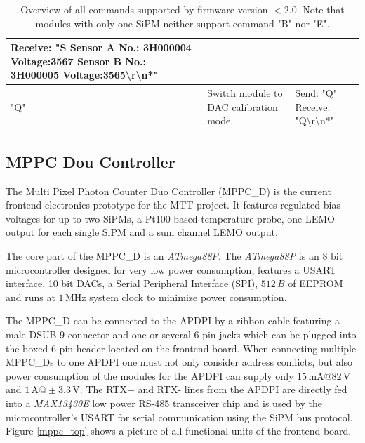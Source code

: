 \begin{table}
\begin{center}
\begin{tabular}[]{|l||p{6cm}|p{4cm}|}
			\newline Receive: "S Sensor A No.: 3H000004 Voltage:3567 Sensor B No.: 3H000005 Voltage:3565\textbackslash r\textbackslash n*" \\
			\hline
			"Q" & Switch module to DAC calibration mode. & Send: "Q" \newline Receive: "Q\textbackslash r\textbackslash n*" \\
			\hline
			\end{tabular}
		\end{center}
		\caption{Overview of all commands supported by firmware version $<2.0$. Note that modules with only one SiPM neither support command "B" nor "E".}
		\label{sipm_bus_table}
	\end{table}

\subsection{MPPC Dou Controller}

The Multi Pixel Photon Counter Duo Controller (MPPC\_D) is the current frontend electronics prototype for the MTT project. It features regulated bias voltages for up to two SiPMs, 
a Pt100 based temperature probe, one LEMO output for each single SiPM and a sum channel LEMO output.

The core part of the MPPC\_D is an \emph{ATmega88P}. The \emph{ATmega88P} is an 8 bit microcontroller designed for very low power consumption, features a 
USART interface, 10 bit DACs, a Serial Peripheral Interface (SPI), $512\,B$ of EEPROM and runs at $1\,\text{MHz}$ system clock to minimize power consumption. 

The MPPC\_D can be connected to the APDPI by a ribbon cable featuring a male DSUB-9 connector and one or several 6 pin jacks which can be plugged into the boxed 6 pin header
located on the frontend board. When connecting multiple MPPC\_Ds to one APDPI one must not only consider address conflicts, but also power consumption of the modules for the APDPI
can supply only $15\,\text{mA}@82\,\text{V}$ and $1\,\text{A}@\pm3.3\,\text{V}$. The RTX+ and RTX- lines from the APDPI are directly fed into a \emph{MAX13430E} low power RS-485 
transceiver chip and is used by the microcontroller's USART for serial communication using the SiPM bus protocol.  
Figure \ref{mppc_top} shows a picture of all functional units of the frontend board.
	
